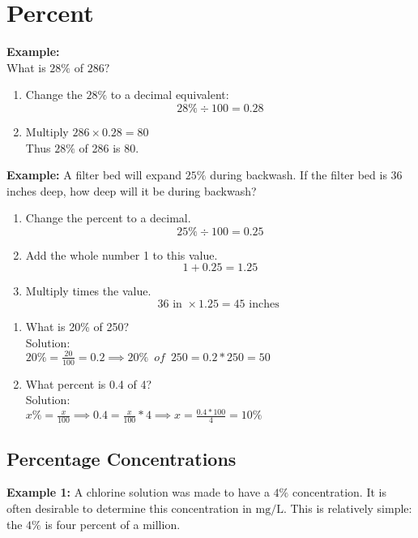 \documentclass{article}
\begin{document}
\section{Percent}
\textbf{Example:}\\
What is $28 \%$ of $286 ?$\\

\begin{enumerate}[Step 1.]
\item Change the $28 \%$ to a decimal equivalent:  $$28 \% \div 100=0.28$$
\item Multiply $286 \times 0.28=80$\\
Thus $28 \%$ of 286 is 80.
\end{enumerate}

\textbf{Example:} A filter bed will expand $25 \%$ during backwash. If the filter bed is 36 inches deep, how deep will it be during backwash?\\

\begin{enumerate}[Step 1.]
\item Change the percent to a decimal.
$$
25 \% \div 100=0.25
$$
\item Add the whole number 1 to this value.
$$
1+0.25=1.25
$$
\item Multiply times the value.
$$
36 \text { in } \times 1.25=45 \text { inches }
$$
\end{enumerate}

\begin{enumerate}

\item What is 20\% of 250?\\
Solution:\\
$20\%=\frac{20}{100}=0.2 \implies 20\% \enspace of \enspace 250=0.2*250=\boxed{50}$

\item What percent is 0.4 of 4?\\
Solution:\\
$x\%=\frac{x}{100} \implies 0.4=\frac{x}{100}*4 \implies x=\frac{0.4*100}{4}=\boxed{10\%}$

\end{enumerate}


\subsection{Percentage Concentrations}

\textbf{Example 1:} A chlorine solution was made to have a $4 \%$ concentration. It is often desirable to determine this concentration in $\mathrm{mg} / \mathrm{L}$. This is relatively simple: the $4 \%$ is four percent of a million.
\end{document}
